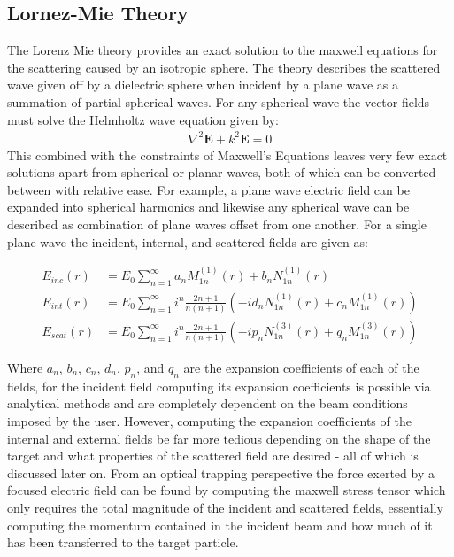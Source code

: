 \documentclass[a4paper,oneside,11pt]{book}
\begin{document}
\subsection{Lornez-Mie Theory}
The Lorenz Mie theory provides an exact solution to the maxwell equations for the scattering caused by an isotropic sphere. The theory describes the scattered wave given off by a dielectric sphere when incident by a plane wave as a summation of partial spherical waves. For any spherical wave the vector fields must solve the Helmholtz wave equation given by:
\begin{align}
	\nabla^2\mathbf{E} +k^2\mathbf{E} = 0
\end{align} 
This combined with the constraints of Maxwell's Equations leaves very few exact solutions apart from spherical or planar waves, both of which can be converted between with relative ease. For example, a plane wave electric field can be expanded into spherical harmonics and likewise any spherical wave can be described as combination of plane waves offset from one another. For a single plane wave the incident, internal, and scattered fields are given as:

\begin{align}
	E_{inc}(r) &= E_0 \sum_{n=1}^\infty a_{n}M_{1n}^{(1)}(r)+b_{n}N_{1n}^{(1)}(r) \\
	E_{int}(r) &= E_0 \sum_{n=1}^\infty i^n\frac{2n+1}{n(n+1)}\left(-id_{n}N_{1n}^{(1)}(r)+c_{n}M_{1n}^{(1)}(r)\right) \\
	E_{scat}(r) &= E_0 \sum_{n=1}^\infty  i^n\frac{2n+1}{n(n+1)}\left(-ip_{n}N_{1n}^{(3)}(r)+q_{n}M_{1n}^{(3)}(r)\right)
\end{align}

Where $a_n$, $b_n$, $c_n$, $d_n$, $p_n$, and $q_n$ are the expansion coefficients of each of the fields, for the incident field computing its expansion coefficients is possible via analytical methods and are completely dependent on the beam conditions imposed by the user. However, computing the expansion coefficients of the internal and external fields be far more tedious depending on the shape of the target and what properties of the scattered field are desired - all of which is discussed later on. From an optical trapping perspective the force exerted by a focused electric field can be found by computing the maxwell stress tensor which only requires the total magnitude of the incident and scattered fields, essentially computing the momentum contained in the incident beam and how much of it has been transferred to the target particle. 
\end{document}
